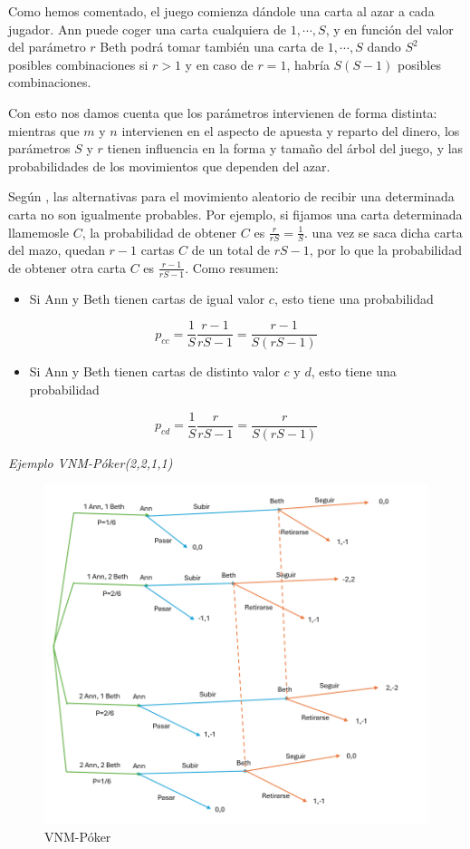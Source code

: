 \documentclass[12pt,a4paper,]{book}
\providecommand{\tightlist}{%
  \setlength{\itemsep}{0pt}\setlength{\parskip}{0pt}}
\numberwithin{dummy}{section}
\theoremstyle{ocrenumbox}
\theoremstyle{blacknumex}
\theoremstyle{blacknumbox}
\theoremstyle{ocrenum}
\theoremstyle{ocrenum}
\begin{document}
Como hemos comentado, el juego comienza dándole una carta al azar a cada
jugador. Ann puede coger una carta cualquiera de \(1,\cdots,S\), y en
función del valor del parámetro \(r\) Beth podrá tomar también una carta
de \(1,\cdots,S\) dando \(S^2\) posibles combinaciones si \(r>1\) y en
caso de \(r = 1\), habría \(S(S-1)\) posibles combinaciones.

Con esto nos damos cuenta que los parámetros intervienen de forma
distinta: mientras que \(m\) y \(n\) intervienen en el aspecto de
apuesta y reparto del dinero, los parámetros \(S\) y \(r\) tienen
influencia en la forma y tamaño del árbol del juego, y las
probabilidades de los movimientos que dependen del azar.

Según \citep{Libro5}, las alternativas para el movimiento aleatorio de
recibir una determinada carta no son igualmente probables. Por ejemplo,
si fijamos una carta determinada llamemosle \(C\), la probabilidad de
obtener \(C\) es \(\frac{r}{rS}= \frac{1}{S}\). una vez se saca dicha
carta del mazo, quedan \(r-1\) cartas \(C\) de un total de \(rS-1\), por
lo que la probabilidad de obtener otra carta \(C\) es
\(\frac{r-1}{rS-1}\). Como resumen:

\begin{itemize}
\tightlist
\item
  Si Ann y Beth tienen cartas de igual valor \(c\), esto tiene una
  probabilidad
\end{itemize}

\[
p_{cc}=\frac{1}{S}  \frac{r-1}{rS-1}=\frac{r-1}{S(rS-1)}
\]

\begin{itemize}
\tightlist
\item
  Si Ann y Beth tienen cartas de distinto valor \(c\) y \(d\), esto
  tiene una probabilidad
\end{itemize}

\[
p_{cd}=\frac{1}{S}  \frac{r}{rS-1}=\frac{r}{S(rS-1)}
\]

\emph{Ejemplo VNM-Póker(2,2,1,1)}

\begin{figure}[H]

{\centering \includegraphics[width=0.8\linewidth]{Ejemplo_VNM} 

}

\caption{\label{ejemplo_VNM}VNM-Póker}\label{fig:ejemplo_VNM}
\end{figure}
\end{document}
